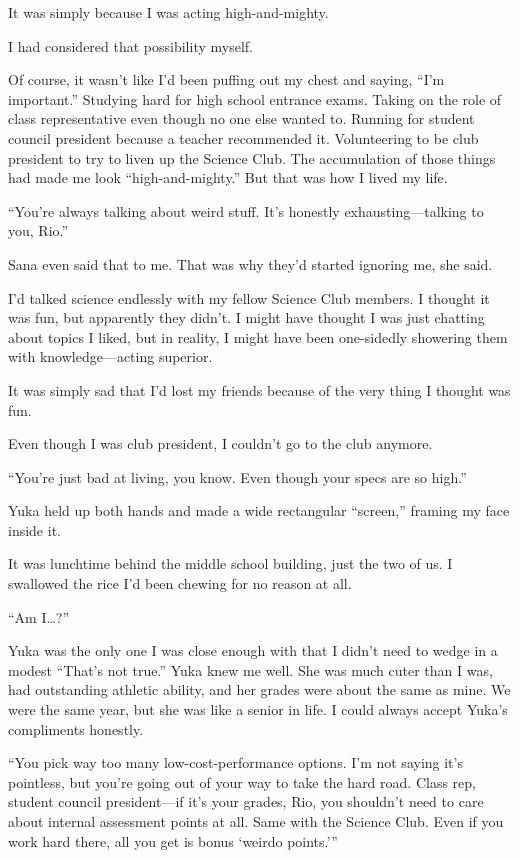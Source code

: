 \documentclass[
    a4paper,
    12pt,
    twoside,
    openany,
    UTF8,
    fontset=windows
]{ctexbook}
\begin{document}
It was simply because I was acting high-and-mighty.

I had considered that possibility myself.

Of course, it wasn't like I'd been puffing out my chest and saying, ``I'm important.'' Studying hard for high school entrance exams. Taking on the role of class representative even though no one else wanted to. Running for student council president because a teacher recommended it. Volunteering to be club president to try to liven up the Science Club. The accumulation of those things had made me look ``high-and-mighty.'' But that was how I lived my life.

``You're always talking about weird stuff. It's honestly exhausting---talking to you, Rio.''

Sana even said that to me. That was why they'd started ignoring me, she said.

I'd talked science endlessly with my fellow Science Club members. I thought it was fun, but apparently they didn't. I might have thought I was just chatting about topics I liked, but in reality, I might have been one-sidedly showering them with knowledge---acting superior.

It was simply sad that I'd lost my friends because of the very thing I thought was fun.

Even though I was club president, I couldn't go to the club anymore.

``You're just bad at living, you know. Even though your specs are so high.''

Yuka held up both hands and made a wide rectangular ``screen,'' framing my face inside it.

It was lunchtime behind the middle school building, just the two of us. I swallowed the rice I'd been chewing for no reason at all.

``Am I\dots?''

Yuka was the only one I was close enough with that I didn't need to wedge in a modest ``That's not true.'' Yuka knew me well. She was much cuter than I was, had outstanding athletic ability, and her grades were about the same as mine. We were the same year, but she was like a senior in life. I could always accept Yuka's compliments honestly.

``You pick way too many low-cost-performance options. I'm not saying it's pointless, but you're going out of your way to take the hard road. Class rep, student council president---if it's your grades, Rio, you shouldn't need to care about internal assessment points at all. Same with the Science Club. Even if you work hard there, all you get is bonus `weirdo points.'''
\end{document}
